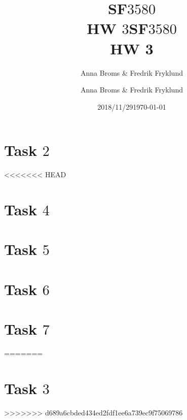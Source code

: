 \documentclass[a4paper]{article}
\title{SF$3580$\\HW $3$}
\author{Anna Broms \& Fredrik Fryklund}
\date{2018/11/29}
\title{SF$3580$\\HW 3}
\author{Anna Broms \& Fredrik Fryklund}
\date{\today}
\begin{document}
\maketitle

 \section*{Task $2$}
<<<<<<< HEAD
 \section*{Task $4$}
 \section*{Task $5$}
 
 \section*{Task $6$}
\section*{Task $7$}
% 
=======
 

 \section*{Task $3$}
 
%
>>>>>>> d689a6cbded434ed2fdf1ee6a739ec9f75069786
\end{document}
